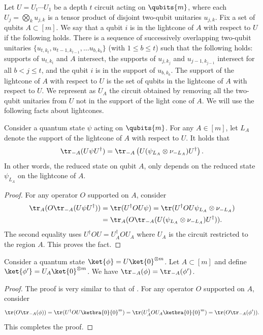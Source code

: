 \documentclass{toc}
\begin{document}
Let $U = U_t \cdots U_1$ be a depth $t$ circuit acting on $\qubits{m}$, where each $U_j = \bigotimes_k u_{j,k}$ is a tensor product of disjoint two-qubit unitaries $u_{j,k}$. Fix a set of qubits $A\subset [m]$. We say that a qubit $i$ is in the lightcone of $A$ with respect to $U$ if the following holds. There is a sequence of successively overlapping two-qubit unitaries $\{u_{t,k_t}, u_{t-1,k_{t-1}},\ldots u_{b,k_b}\}$ (with $1\leq b \leq t$) such that the following holds: supports of $u_{t,k_t}$ and $A$ intersect, the supports of $u_{j,k_j}$ and $u_{j-1,k_{j-1}}$ intersect for all $b< j\leq t$, and the qubit $i$ is in the support of $u_{b,k_b}$. The support of the lightcone of $A$ with respect to $U$ is the set of qubits in the lightcone of $A$ with respect to $U$. We represent as $U_{A}$ the circuit obtained by removing all the two-qubit unitaries from $U$ not in the support of the light cone of $A$. We will use the following facts about lightcones.

\begin{fact}
\label{fact:lightfact2}
Consider a quantum state $\psi$ acting on $\qubits{m}$. For any $A\in [m]$, let $L_A$ denote the support of the lightcone of $A$ with respect to $U$. It holds that
\begin{align}\tr_{-A}(U\psi U^{\dagger}) = \tr_{-A}\left(U (\psi_{L_A}\otimes \nu_{-L_A})U^{\dagger}\right).
\end{align}
In other words, the reduced %
state on qubit $A$, only depends on the reduced %
state $\psi_{L_A}$ on the lightcone of $A$.
\end{fact}
\begin{proof}
For any operator $O$ supported on $A$, consider 
\begin{align}
\tr_A(O\tr_{-A}(U\psi U^{\dagger}))&=\tr(U^{\dagger}O U \psi) = \tr(U^{\dagger}O U \psi_{L_A}\otimes \nu_{-L_A})\\
&=\tr_A(O\tr_{-A}(U(\psi_{L_A}\otimes \nu_{-L_A})U^{\dagger})).
\end{align}
The second equality uses $U^{\dagger}O U=U_A^{\dagger}O U_A$ where $U_A$ is the circuit restricted to the region $A$. This proves the fact.
\end{proof}

\begin{fact}
\label{fact:lightfact3}
Consider a quantum state $\ket{\phi}=U\ket{0}^{\otimes m}$. Let $A\subset [m]$ and define $\ket{\phi'}=U_A\ket{0}^{\otimes m}$. We have $\tr_{-A}(\phi)=\tr_{-A}(\phi')$.
\end{fact}
\begin{proof}
The proof is very similar to that of . For any operator $O$ supported on $A$, consider 
\begin{align}
\tr(O\tr_{-A}(\phi))=\tr(U^{\dagger}O U \ketbra{0}{0}^m) = \tr(U_A^{\dagger}O U_A \ketbra{0}{0}^m)=\tr(O\tr_{-A}(\phi')).
\end{align}
This completes the proof.
\end{proof}
\end{document}
